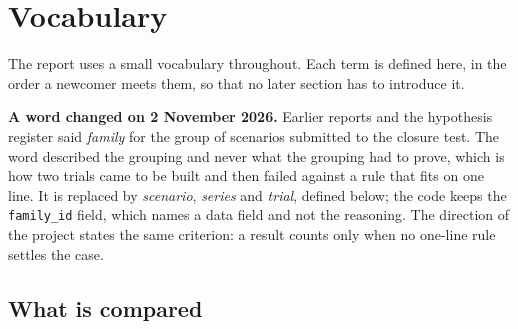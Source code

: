 \section{Vocabulary}

The report uses a small vocabulary throughout. Each term is defined here, in the
order a newcomer meets them, so that no later section has to introduce it.

\textbf{A word changed on 2 November 2026.} Earlier reports and the hypothesis
register said \emph{family} for the group of scenarios submitted to the closure
test. The word described the grouping and never what the grouping had to prove,
which is how two trials came to be built and then failed against a rule that
fits on one line. It is replaced by \emph{scenario}, \emph{series} and
\emph{trial}, defined below; the code keeps the \texttt{family\_id} field, which names a
data field and not the reasoning. The direction of the project states the same
criterion: a result counts only when no one-line rule settles the case.

\subsection{What is compared}

